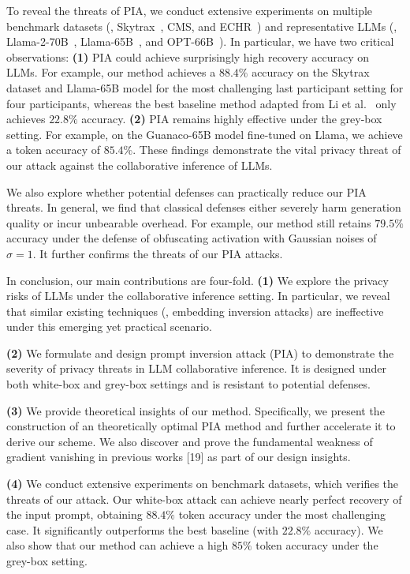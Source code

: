 To reveal the threats of PIA, we conduct extensive experiments on multiple benchmark datasets (\ie, Skytrax~\cite{skytrax}, CMS\cite{cms}, and ECHR~\cite{echr}) and representative LLMs (\ie, Llama-2-70B~\cite{llama2}, Llama-65B~\cite{llama}, and OPT-66B~\cite{opt}). In particular, we have two critical observations: \textbf{(1)} PIA could achieve surprisingly high recovery accuracy on LLMs. 
For example, our method achieves a $88.4\%$ accuracy on the Skytrax dataset and Llama-65B model for the most challenging last participant setting for four participants, whereas the best baseline method adapted from Li et al.~\cite{Generative-embedding-inversion-attack} only achieves $22.8\%$ accuracy. \textbf{(2)} PIA remains highly effective under the grey-box setting. For example, on the Guanaco-65B model fine-tuned on Llama, we achieve a token accuracy of $85.4\%$. These findings demonstrate the vital privacy threat of our attack against the collaborative inference of LLMs.


We also explore whether potential defenses can practically reduce our PIA threats. In general, we find that classical defenses either severely harm generation quality or incur unbearable overhead. For example, our method still retains $79.5\%$ accuracy under the defense of obfuscating activation with Gaussian noises of $\sigma=1$. It further confirms the threats of our PIA attacks.



In conclusion, our main contributions are four-fold. \textbf{(1)} We explore the privacy risks of LLMs under the collaborative inference setting. In particular, we reveal that similar existing techniques (\eg, embedding inversion attacks) are ineffective under this emerging yet practical scenario. 

\textbf{(2)} We formulate and design prompt inversion attack (PIA) to demonstrate the severity of privacy threats in LLM collaborative inference. It is designed under both white-box and grey-box settings and is resistant to potential defenses. 

\textbf{(3)} We provide theoretical insights of our method. Specifically, we present the construction of an theoretically optimal PIA method and further accelerate it to derive our scheme.  We also discover and prove the fundamental weakness of gradient vanishing in previous works [19] as part of our design insights. 

\textbf{(4)} We conduct extensive experiments on benchmark datasets, which verifies the threats of our attack. 
Our white-box attack can achieve nearly perfect recovery of the input prompt, obtaining $88.4\%$ token accuracy under the most challenging case. It significantly outperforms the best baseline (with $22.8\%$ accuracy). We also show that our method can achieve a high $85\%$ token accuracy under the grey-box setting.



